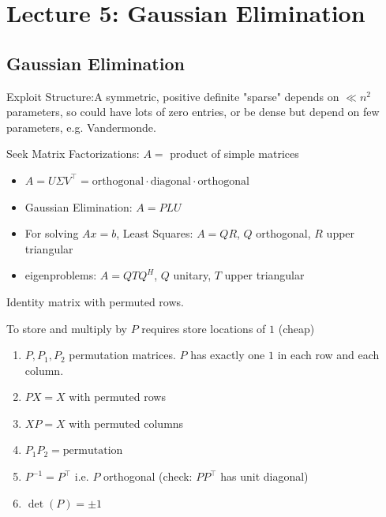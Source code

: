 \documentclass[11pt]{article}
\numberwithin{equation}{section}
\begin{document}
\newpage
\section{Lecture 5: Gaussian Elimination}
\subsection{Gaussian Elimination}
Exploit Structure:A symmetric, positive definite "sparse" depends on $\ll n^2$ parameters, so could have lots of zero entries, or be dense but depend on few parameters, e.g. Vandermonde.

Seek Matrix Factorizations: $A=$ product of simple matrices
\begin{itemize}
    \item $A=U \Sigma V^{\top}=\text{orthogonal}\cdot\text{diagonal}\cdot \text{orthogonal}$
    \item Gaussian Elimination: $A=PL U$ 
    \item For solving $Ax=b$, Least Squares: $A=Q  R$, $Q$ orthogonal, $R$ upper triangular
    \item eigenproblems: $A=QTQ^H$, $Q$ unitary, $T$ upper triangular
\end{itemize}

\begin{definition}
    Identity matrix with permuted rows.
\end{definition}

\begin{fact}
    To store and multiply by $P$ requires store locations of $1$ (cheap)
    \begin{enumerate}
        \item $P,P_1, P_2$ permutation matrices. $P$ has exactly one $1$ in each row and each column.
        \item $P X = X$ with permuted rows
        \item $X P = X$ with permuted columns
        \item $P_1  P_2 = \text{permutation}$ 
        \item $P^{-1}=P^{\top}$ i.e. $P$ orthogonal (check: $P P^{\top}$ has unit diagonal)
        \item $\operatorname{det}(P) = \pm 1$
    \end{enumerate}
\end{fact}
\end{document}
